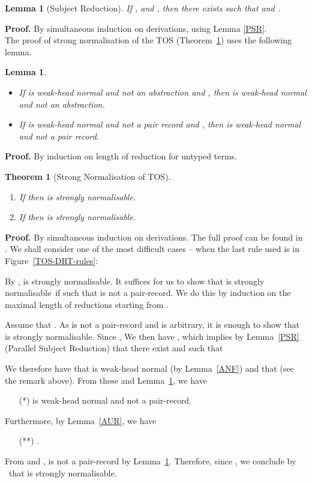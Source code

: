 \documentclass[submission,copyright,creativecommons]{eptcs}
\newcommand{\selfcomment}[1]{\ifodd 0 {\sf #1 }\fi}
\newcommand{\selfc}{\selfcomment}
\newtheorem{theorem}[definition]{Theorem}
\newtheorem{lemma}[definition]{Lemma}
\renewcommand{\SN}{strongly normalisable}
\begin{document}
\begin{lemma}[Subject Reduction] \label{SR}
If ,  and , then there exists  such that  and .
\end{lemma}
\textbf{Proof.} By simultaneous induction on derivations, using Lemma \ref{PSR}.
\ \\

The proof of strong normalisation of the TOS (Theorem~\ref{SN-TOS}) uses the following lemma.

\begin{lemma}\label{NOT-ABS-PAIR}\
\begin{itemize}
  \item If  is weak-head normal and not an abstraction and , then  is weak-head normal and not an abstraction.
  \item If  is weak-head normal and not a pair record and , then  is weak-head normal and not a pair record.
\end{itemize}
\end{lemma}
\textbf{Proof.} By induction on length of reduction for untyped terms.

\begin{theorem}[Strong Normalisation of TOS] \label{SN-TOS}\
\begin{enumerate}
  \item If  then  is strongly normalisable.
  \item If  then  is strongly normalisable.
\end{enumerate}
\end{theorem}
\textbf{Proof.} By simultaneous induction on derivations.   The full proof can be found in \cite{Fen10}.  We shall consider one of the most difficult cases -- when the last rule used is  in Figure~\ref{TOS-DRT-rules}:
  
By \IH,  is \SN.  It suffices for us to show that  is \SN\ if  such that  is not a pair-record.  We do this by induction on the maximal length of reductions starting from .

Assume that .  \selfc{As  is not a pair-record and  is arbitrary, it is enough to show that  is \SN. Since ,}  We then have , which implies by Lemma~\ref{PSR} (Parallel Subject Reduction) that there exist  and  such that

We therefore have that  is weak-head normal (by Lemma~\ref{ANF}) and that  (see the remark above).  From these and Lemma~\ref{NOT-ABS-PAIR}, we have
\begin{itemize}
  \item[(*)]  is weak-head normal and not a pair-record.
\end{itemize}
Furthermore, by Lemma~\ref{AUR}, we have
\begin{itemize}
  \item[(**)] .
\end{itemize}
From  and ,  is not a pair-record by Lemma~\ref{NOT-ABS-PAIR}.  Therefore, since , we conclude by \IH\ that  is \SN.
\end{document}
